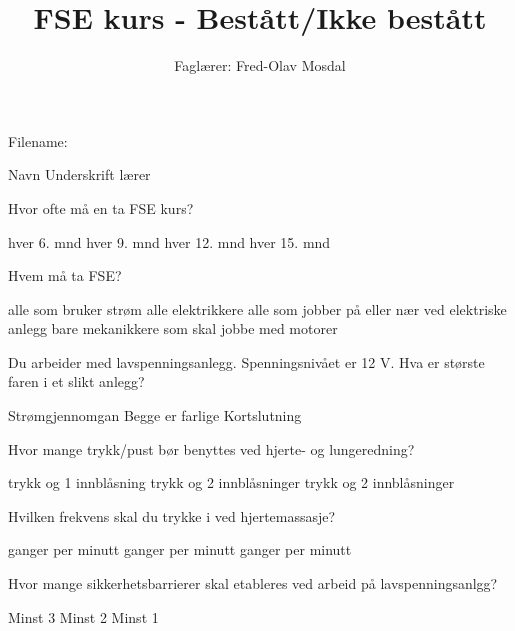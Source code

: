 \documentclass{exam}
\begin{document}
\title{FSE kurs -  Bestått/Ikke bestått}
\author{Faglærer: Fred-Olav Mosdal \\}
\maketitle
\begin{center}
Filename: \currfile
\end{center}

\vskip 5cm 
\Huge
Navn \uline{\hfill}
\vskip 2cm 
Underskrift lærer \uline{\hfill}
\vskip 0.5cm
\normalsize
\newpage
\begin{questions}
        
	\question Hvor ofte må  en ta FSE kurs? 
		\begin{oneparcheckboxes}
			\choice hver 6. mnd
			\choice hver 9. mnd
			\choice hver 12. mnd
			\choice hver 15. mnd
		\end{oneparcheckboxes}

	\question Hvem må ta FSE?
		\begin{oneparcheckboxes}
			\choice alle som bruker strøm
			\choice alle elektrikkere
			\choice alle som jobber på eller nær ved elektriske anlegg
			\choice bare mekanikkere som skal jobbe med motorer
		\end{oneparcheckboxes}

	\question Du arbeider med lavspenningsanlegg. Spenningsnivået er 12 V. Hva er største faren i et slikt anlegg?
	\begin{oneparcheckboxes}
		\choice Strømgjennomgan
		\choice Begge er farlige
		\choice Kortslutning
	\end{oneparcheckboxes}

	\question Hvor mange trykk/pust bør benyttes ved hjerte- og lungeredning?
		\begin{oneparcheckboxes}
			 trykk og 1 innblåsning
			 trykk og 2 innblåsninger
			 trykk og 2 innblåsninger
		\end{oneparcheckboxes}


	\question Hvilken frekvens skal du trykke i ved hjertemassasje?
		\begin{oneparcheckboxes}
			 ganger per minutt
			 ganger per minutt
			 ganger per minutt
		\end{oneparcheckboxes}
		
	\question Hvor mange sikkerhetsbarrierer skal etableres ved arbeid på lavspenningsanlgg?
		\begin{oneparcheckboxes}
			\choice Minst 3
			\choice Minst 2
			\choice Minst 1
		\end{oneparcheckboxes}
		

\end{questions}
\end{document}

